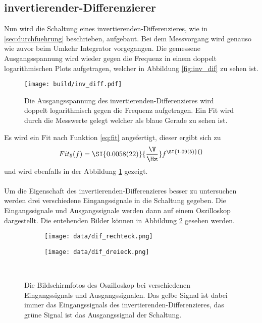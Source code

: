 \subsection{invertierender-Differenzierer}
Nun wird die Schaltung eines invertierenden-Differenzieres, wie in \ref{sec:durchfuehrung} beschrieben, aufgebaut.
Bei dem Messvorgang wird genauso wie zuvor beim Umkehr Integrator vorgegangen.
Die gemessene Ausgangsspannung wird wieder gegen die Frequenz in einem doppelt logarithmischen Plots aufgetragen, welcher in Abbildung \ref{fig:inv_dif} zu sehen ist.
\begin{figure}
    \centering
    \texttt{[image: build/inv\_diff.pdf]}
    \caption{Die Ausgangsspannung des invertierenden-Differenzieres wird doppelt logarithmisch gegen die Frequenz aufgetragen.
    Ein Fit wird durch die Messwerte gelegt welcher als blaue Gerade zu sehen ist.}
    \label{fig:inv_diff}
\end{figure}
Es wird ein Fit nach Funktion \eqref{eq:fit} angefertigt, dieser ergibt sich zu 
\begin{equation*}
    Fit_5(f) = \SI{0.0058(22)}{\frac{\V}{\Hz}} f^{\SI{1.09(5)}{}}
\end{equation*}
und wird ebenfalls in der Abbildung \ref{fig:inv_diff} gezeigt.\\\\
Um die Eigenschaft des invertierenden-Differenzieres besser zu untersuchen werden drei verschiedene Eingangssignale in die Schaltung gegeben.
Die Eingangssignale und Ausgangssignale werden dann auf einem Oszilloskop dargestellt.
Die entehenden Bilder können in Abbildung \ref{fig:dif_oszi} gesehen werden.
\begin{figure}
    \centering
    \begin{subfigure}{0.49\linewidth}%
        \texttt{[image: data/dif\_rechteck.png]}
    \end{subfigure}
    \hfill
    \begin{subfigure}{0.49\linewidth}%
        \texttt{[image: data/dif\_dreieck.png]}
    \end{subfigure}\\
    \caption{Die Bildschirmfotos des Oszilloskop bei verschiedenen Eingangssignals und Ausgangssignalen.
    Das gelbe Signal ist dabei immer das Eingangssignals des invertierenden-Differenzieres, das grüne Signal ist das Ausgangssignal der Schaltung.}
    \label{fig:dif_oszi}
\end{figure}
\FloatBarrier
